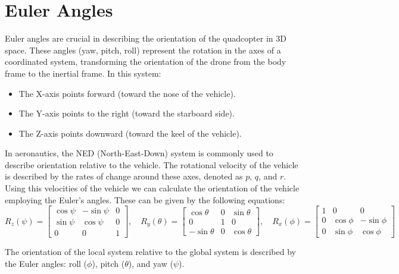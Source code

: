 \documentclass[a4paper,12pt]{report}
\begin{document}
\section{Euler Angles}
Euler angles are crucial in describing the orientation of the quadcopter in 3D space.
These angles (yaw, pitch, roll) represent the rotation in the axes of a coordinated system, transforming the orientation of the drone from the body frame to the inertial frame.
In this system:
\begin{itemize}
    \item The X-axis points forward (toward the nose of the vehicle).
    \item The Y-axis points to the right (toward the starboard side).
    \item The Z-axis points downward (toward the keel of the vehicle).
\end{itemize}

In aeronautics, the NED (North-East-Down) system is commonly used to describe orientation relative to the vehicle. 
The rotational velocity of the vehicle is described by the rates of change around these axes, denoted as \(p\), \(q\), and \(r\). 
Using this velocities of the vehicle we can calculate the orientation of the vehicle employing the Euler’s angles. These can be given by the following equations:
\[
    R_z(\psi) = \begin{bmatrix}
        \cos \psi & -\sin \psi & 0 \\
        \sin \psi & \cos \psi  & 0 \\
        0         & 0          & 1
    \end{bmatrix}, \quad
    R_y(\theta) = \begin{bmatrix}
        \cos \theta  & 0 & \sin \theta \\
        0            & 1 & 0           \\
        -\sin \theta & 0 & \cos \theta
    \end{bmatrix}, \quad
    R_x(\phi) = \begin{bmatrix}
        1 & 0         & 0          \\
        0 & \cos \phi & -\sin \phi \\
        0 & \sin \phi & \cos \phi
    \end{bmatrix}
\]

The orientation of the local system relative to the global system is described by the Euler angles: roll (\(\phi\)), pitch (\(\theta\)), and yaw (\(\psi\)).
\end{document}
